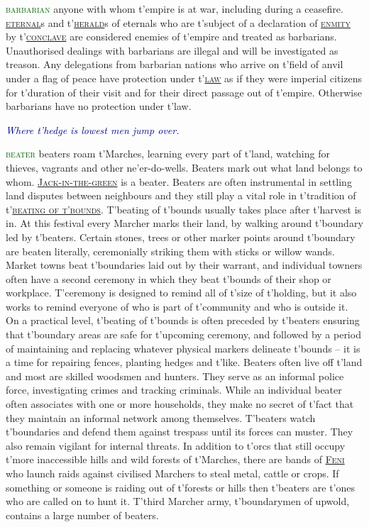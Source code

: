 \documentclass[twoside,11pt,b5paper,twocolumn]{scrbook}
\newcommand{\estcab}[1]{\textsc{\textcolor{marron}{#1}}}
\renewcommand{\paragraph}[1]{\par\noindent\markboth{#1}{#1}\estcab{\textcolor{darkgreen}{#1}}\label{#1} }
\newcommand{\see}[1]{{\estcab{\hyperref[#1]{#1}}}}
\newcommand{\proverb}[1]{\par \textcolor{darkblue}{\itshape #1}}
\begin{document}
\paragraph{barbarian} anyone with whom t'empire is at war, including during a ceasefire. \see{eternal}s and t'\see{herald}s of eternals who are t'subject of a declaration of \see{enmity} by t'\see{conclave} are considered enemies of t'empire and treated as barbarians. Unauthorised dealings with barbarians are illegal and will be investigated as treason. Any delegations from barbarian nations who arrive on t'field of anvil under a flag of peace have protection under t'\see{law} as if they were imperial citizens for t'duration of their visit and for their direct passage out of t'empire. Otherwise barbarians have no protection under t'law.\proverb{Where t'hedge is lowest men jump over.}
\paragraph{beater} beaters roam t'Marches, learning every part of t'land, watching for thieves, vagrants and other ne'er-do-wells. Beaters mark out what land belongs to whom. \see{Jack-in-the-green} is a beater. Beaters are often instrumental in settling land disputes between neighbours and they still play a vital role in t'tradition of t'\see{beating of t'bounds}. T'beating of t'bounds usually takes place after t'harvest is in. At this festival every Marcher marks their land, by walking around t'boundary led by t'beaters. Certain stones, trees or other marker points around t'boundary are beaten literally, ceremonially striking them with sticks or willow wands. Market towns beat t'boundaries laid out by their warrant, and individual towners often have a second ceremony in which they beat t'bounds of their shop or workplace. T'ceremony is designed to remind all of t'size of t'holding, but it also works to remind everyone of who is part of t'community and who is outside it. On a practical level, t'beating of t'bounds is often preceded by t'beaters ensuring that t'boundary areas are safe for t'upcoming ceremony, and followed by a period of maintaining and replacing whatever physical markers delineate t'bounds – it is a time for repairing fences, planting hedges and t'like. Beaters often live off t'land and most are skilled woodsmen and hunters. They serve as an informal police force, investigating crimes and tracking criminals. While an individual beater often associates with one or more households, they make no secret of t'fact that they maintain an informal network among themselves. T'beaters watch t'boundaries and defend them against trespass until its forces can muster. They also remain vigilant for internal threats. In addition to t'orcs that still occupy t'more inaccessible hills and wild forests of t'Marches, there are bands of \see{Feni} who launch raids against civilised Marchers to steal metal, cattle or crops. If something or someone is raiding out of t'forests or hills then t'beaters are t'ones who are called on to hunt it. T'third Marcher army, t'boundarymen of upwold, contains a large number of beaters.
\end{document}
